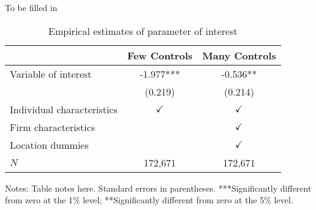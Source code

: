 \documentclass[12pt,english]{article}
\begin{document}
To be filled in
\begin{table}[ht]
\caption{Empirical estimates of parameter of interest}
\label{tab:estimates} 
\centering
\begin{threeparttable}
\begin{tabular}{lcc}
\toprule
                            & Few Controls    & Many Controls \\
\midrule
Variable of interest        & -1.977***       & -0.536**    \\
                            & (0.219)         & (0.214)     \\
Individual characteristics  & $\checkmark$    & $\checkmark$\\
Firm characteristics        &                 & $\checkmark$\\
Location dummies            &                 & $\checkmark$\\
\midrule
$N$                         & 172,671         & 172,671      \\
\bottomrule
\end{tabular}
\footnotesize Notes: Table notes here. Standard errors in parentheses. ***Significantly different from zero at the 1\% level; **Significantly different from zero at the 5\% level.
\end{threeparttable}
\end{table}
\end{document}
